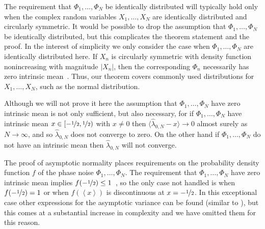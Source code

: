 \documentclass[aap,preprint]{imsart}
\newcommand{\fracpart}[1]{\left\langle #1 \right\rangle}
\newcommand{\sfracpart}[1]{\langle #1 \rangle}
\newcommand{\abs}[1]{\left\vert #1 \right\vert}
\begin{document}
The requirement that $\Phi_1, \dots, \Phi_N$ be identically distributed will typically hold only when the complex random variables $X_1, \dots, X_N$ are identically distributed and circularly symmetric.  It would be possible to drop the assumption that $\Phi_1, \dots, \Phi_N$ be identically distributed, but this complicates the theorem statement and the proof.  In the interest of simplicity we only consider the case when $\Phi_1, \dots, \Phi_N$ are identically distributed here.  If $X_n$ is circularly symmetric with density function nonincreasing with magnitude $\abs{X_n}$, then the corresponding $\Phi_n$ necessarily has zero intrinsic mean~\cite[Theorem 5.2]{McKilliam2010thesis}.  Thus, our theorem covers commonly used distributions for $X_1, \dots, X_N$, such as the normal distribution.

Although we will not prove it here the assumption that $\Phi_1,\dots,\Phi_N$ have zero intrinsic mean is not only sufficient, but also necessary, for if $\Phi_1,\dots,\Phi_N$ have intrinsic mean $x \in [-\nicefrac{1}{2},\nicefrac{1}{2})$ with $x \neq 0$ then $\sfracpart{\widehat{\lambda}_{0,N} - x}\rightarrow 0$ almost surely as $N\rightarrow\infty$, and so $\widehat{\lambda}_{0,N}$ does not converge to zero.  On the other hand if $\Phi_1,\dots,\Phi_N$ do not have an intrinsic mean then $\widehat{\lambda}_{0,N}$ will not converge.

The proof of asymptotic normality places requirements on the probability density function $f$ of the phase noise $\Phi_1, \dots, \Phi_N$.  The requirement that $\Phi_1, \dots, \Phi_N$ have zero intrinsic mean implies $f(-\nicefrac{1}{2}) \leq 1$~\cite[Lemma~1]{McKilliam_mean_dir_est_sq_arc_length2010}, so the only case not handled is when $f(-\nicefrac{1}{2}) = 1$ or when $f(\fracpart{x})$ is discontinuous at $x = -\nicefrac{1}{2}$. In this exceptional case other expressions for the asymptotic variance can be found (similar to \cite[Theorem 3.1]{Hotz_circle_means_2011}), but this comes at a substantial increase in complexity and we have omitted them for this reason. %
\end{document}
